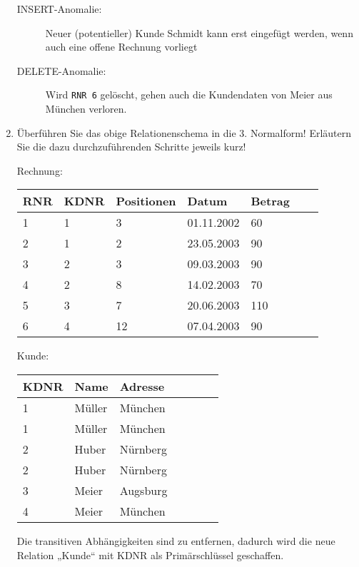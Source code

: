 \documentclass{bschlangaul-aufgabe}
\begin{document}
\begin{enumerate}
\begin{bAntwort}
\begin{description}
\item[INSERT-Anomalie:] Neuer (potentieller) Kunde Schmidt kann erst
eingefügt werden, wenn auch eine offene Rechnung vorliegt

\item[DELETE-Anomalie:] Wird \texttt{RNR 6} gelöscht, gehen auch die
Kundendaten von Meier aus München verloren.
\end{description}

\end{bAntwort}


\item Überführen Sie das obige Relationenschema in die 3. Normalform!
Erläutern Sie die dazu durchzuführenden Schritte jeweils kurz!

\begin{bAntwort}

Rechnung:

\begin{tabular}{|l|l|l|l|l|l|l|}
\textbf{RNR} & \textbf{KDNR} & \textbf{Positionen} & \textbf{Datum} & \textbf{Betrag}
\\\hline
1   & 1    & 3  & 01.11.2002 & 60  \\
2   & 1    & 2  & 23.05.2003 & 90  \\
3   & 2    & 3  & 09.03.2003 & 90  \\
4   & 2    & 8  & 14.02.2003 & 70  \\
5   & 3    & 7  & 20.06.2003 & 110 \\
6   & 4    & 12 & 07.04.2003 & 90
\end{tabular}

Kunde:

\begin{tabular}{|l|l|l|l|l|l|l|}
\textbf{KDNR} & \textbf{Name} & \textbf{Adresse}
\\\hline
1 & Müller & München  \\
1 & Müller & München  \\
2 & Huber  & Nürnberg \\
2 & Huber  & Nürnberg \\
3 & Meier  & Augsburg \\
4 & Meier  & München
\end{tabular}

Die transitiven Abhängigkeiten sind zu entfernen, dadurch wird die neue
Relation „Kunde“ mit KDNR als Primärschlüssel geschaffen.
\end{bAntwort}


\end{enumerate}
\end{document}
